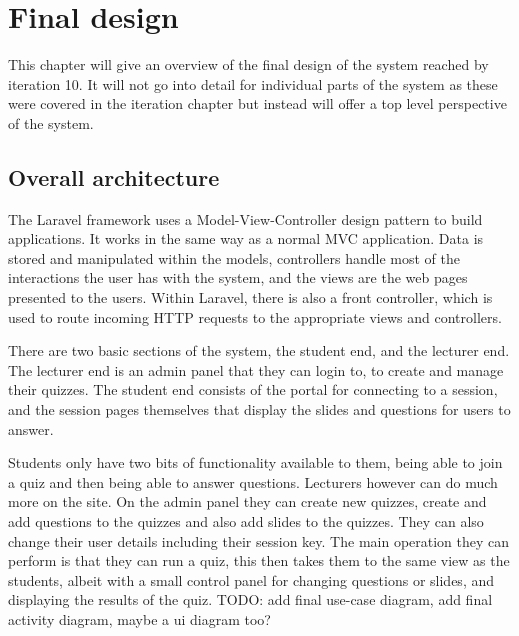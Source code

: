 \chapter{Final design}
This chapter will give an overview of the final design of the system reached by iteration 10. It will not go into detail for individual parts of the system as these were covered in the iteration chapter but instead will offer a top level perspective of the system.

\section{Overall architecture}
The Laravel framework uses a Model-View-Controller design pattern to build applications. It works in the same way as a normal MVC application. Data is stored and manipulated within the models, controllers handle most of the interactions the user has with the system, and the views are the web pages presented to the users. Within Laravel, there is also a front controller, which is used to route incoming HTTP requests to the appropriate views and controllers\cite{Laravel-architechture}.

There are two basic sections of the system, the student end, and the lecturer end. The lecturer end is an admin panel that they can login to, to create and manage their quizzes. The student end consists of the portal for connecting to a session, and the session pages themselves that display the slides and questions for users to answer.

Students only have two bits of functionality available to  them, being able to join a quiz and then being able to answer questions. Lecturers however can do much more on the site. On the admin panel they can create new quizzes, create and add questions to the quizzes and also add slides to the quizzes. They can also change their user details including their session key. The main operation they can perform is that they can run a quiz, this then takes them to the same view as the students, albeit with a small control panel for changing questions or slides, and displaying the results of the quiz. TODO: add final use-case diagram, add final activity diagram, maybe a ui diagram too?

